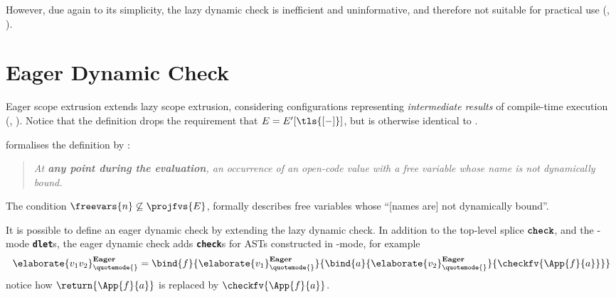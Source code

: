 However, due again to its simplicity, the lazy dynamic check is inefficient and uninformative, and therefore not suitable for practical use \citep{kiselyov-14} (, ).

\section{Eager Dynamic Check}\label{section:eager-dynamic-check-formal}
Eager scope extrusion extends lazy scope extrusion, considering configurations representing \textit{intermediate results} of compile-time execution (, ). Notice that the definition drops the requirement that $E = E'[\tls{[-]}]$, but is otherwise identical to . 



 formalises the definition by \citet{kiselyov-14}:
\begin{quote}
  \textit{At \textbf{any point during the evaluation}, an occurrence of an open-code value with a free variable whose name is not dynamically bound.}
\end{quote}
The condition $\freevars{n} \not\subseteq \projfvs{E}$, formally describes free variables whose ``[names are] not dynamically bound''.

It is possible to define an eager dynamic check by extending the lazy dynamic check. In addition to the top-level splice $\textbf{\texttt{check}}$, and the \compilemode{}-mode \textbf{\texttt{dlet}}s, the eager dynamic check adds \textbf{\texttt{check}}s for ASTs constructed in \quotemode{}-mode, for example 
\[\elaborate{v_1 v_2}_{\quotemode{}}^{\textbf{Eager}} = \bind{f}{\elaborate{v_1}_{\quotemode{}}^{\textbf{Eager}}}{\bind{a}{\elaborate{v_2}_{\quotemode{}}^{\textbf{Eager}}}{\checkfv{\App{f}{a}}}}\]
notice how $\return{\App{f}{a}}$ is replaced by $\checkfv{\App{f}{a}}$. 

